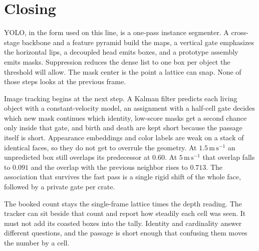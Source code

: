 \documentclass[11pt,a4paper]{article}
\begin{document}
\section{Closing}

YOLO, in the form used on this line, is a one-pass instance segmenter. A cross-stage backbone and a feature pyramid build the maps, a vertical gate emphasizes the horizontal lips, a decoupled head emits boxes, and a prototype assembly emits masks. Suppression reduces the dense list to one box per object the threshold will allow. The mask center is the point a lattice can snap. None of those steps looks at the previous frame.

Image tracking begins at the next step. A Kalman filter predicts each living object with a constant-velocity model, an assignment with a half-cell gate decides which new mask continues which identity, low-score masks get a second chance only inside that gate, and birth and death are kept short because the passage itself is short. Appearance embeddings and color labels are weak on a stack of identical faces, so they do not get to overrule the geometry. At $1.5\,\mathrm{m\,s^{-1}}$ an unpredicted box still overlaps its predecessor at $0.60$. At $5\,\mathrm{m\,s^{-1}}$ that overlap falls to $0.091$ and the overlap with the previous neighbor rises to $0.713$. The association that survives the fast pass is a single rigid shift of the whole face, followed by a private gate per crate.

The booked count stays the single-frame lattice times the depth reading. The tracker can sit beside that count and report how steadily each cell was seen. It must not add its coasted boxes into the tally. Identity and cardinality answer different questions, and the passage is short enough that confusing them moves the number by a cell.
\end{document}
